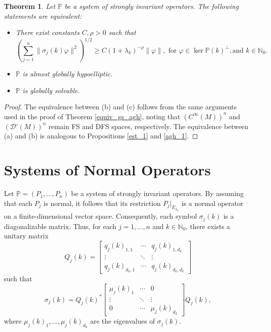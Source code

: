 \documentclass{amsart}
\newtheorem{theorem}{Theorem}[section]
\theoremstyle{definition}
\theoremstyle{remark}
\numberwithin{equation}{section}
\begin{document}
	\begin{theorem}\label{agh_gs_system}
		Let $\mathbb{P}$ be a system of strongly invariant operators. The following statements are equivalent:
		\begin{itemize}
			\item[(a)] There exist constants $C,\rho>0$ such that
			\begin{equation*}
				\left(\sum_{j=1}^{n}\|\sigma_{j}(k)\varphi\|^2\right)^{1/2} \!\!\! \geq C(1+\lambda_k)^{-\rho}\|\varphi\|, \text{ for } \varphi \in \ker\mathbb{P}(k)^\perp, \text{and } k\in\mathbb{N}_0.
			\end{equation*}
			\item[(b)] $\mathbb{P}$ is almost globally hypoelliptic.
			\item[(c)] $\mathbb{P}$ is globally solvable.
		\end{itemize}
	\end{theorem}
	
	\begin{proof}
		The equivalence between (b) and (c) follows from the same arguments used in the proof of Theorem \ref{equiv_gs_agh}, noting that $(C^\infty(M))^n$ and $(\mathscr{D}'(M))^n$ remain FS and DFS spaces, respectively. The equivalence between (a) and (b) is analogous to Propositions \ref{est_1} and \ref{agh_1}.
	\end{proof}

	
\section{Systems of Normal Operators}

	Let $\mathbb{P} = (P_1,\dots,P_n)$ be a system of strongly invariant operators. By assuming that each $P_j$ is normal, it follows that its restriction $P_j|_{E_{\lambda_k}}$ is a normal operator on a finite-dimensional vector space. Consequently, each symbol $\sigma_j(k)$ is a diagonalizable matrix. Thus, for each $j=1,\dots,n$ and $k\in\mathbb{N}_0$, there exists a unitary matrix  
	\begin{equation*}
		Q_j(k)=\begin{bmatrix}
			q_j(k)_{1,1}&\cdots&q_j(k)_{1,d_k}\\
			\vdots&\ddots&\vdots\\
			q_j(k)_{d_k,1}&\cdots&q_j(k)_{d_k,d_k}
		\end{bmatrix}
	\end{equation*}
	such that  
	\begin{equation*}
		\sigma_j(k) = Q_j(k)^*  
		\begin{bmatrix}
			\mu_j(k)_1& \cdots& 0\\
			\vdots&\ddots&\vdots\\
			0&\cdots& \mu_j(k)_{d_k}
		\end{bmatrix}  
		Q_j(k),
	\end{equation*}
	where $\mu_j(k)_1,\dots,\mu_j(k)_{d_k}$ are the eigenvalues of $\sigma_j(k)$.  
	
\end{document}

